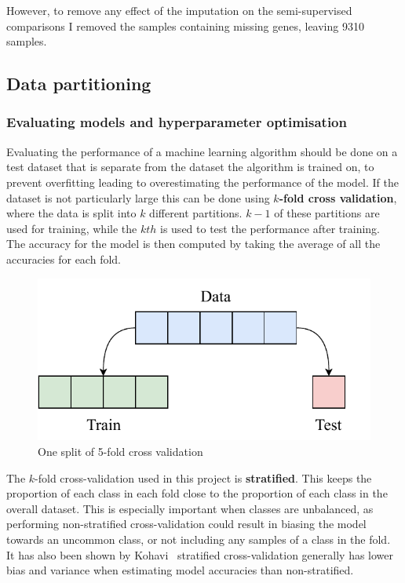 However, to remove any effect of the imputation on the semi-supervised comparisons I removed the samples containing missing genes, leaving 
9310 samples. 

\subsection{Data partitioning} \label{part}
\subsubsection{Evaluating models and hyperparameter optimisation}
Evaluating the performance of a machine learning algorithm should be done on a test dataset that is separate from the dataset the 
algorithm is trained on, to prevent overfitting leading to overestimating the performance of the model. If the dataset is not particularly 
large this can be done using 
\textbf{$k$-fold cross validation}, where the data is split into $k$ different partitions. $k-1$ of these partitions are used for training, 
while the $kth$ is used to test the performance after training. The accuracy for the model is then computed by taking the average of all
the accuracies for each fold.

\begin{figure}[H]
  \centering
  \includegraphics[scale=1]{figs/k_fold.pdf}
  \caption{One split of 5-fold cross validation}
\end{figure}

The $k$-fold cross-validation used in this project is \textbf{stratified}. This keeps the proportion of each class in each fold
close to the proportion of each class in the overall dataset. This is especially important when classes are unbalanced, as performing 
non-stratified cross-validation could result in biasing the model towards an uncommon class, or not including any samples of a class in the 
fold. It has also been shown by Kohavi~\cite{Kohavi:1995:SCB:1643031.1643047} stratified cross-validation generally has lower bias and variance when estimating model 
accuracies than non-stratified.

